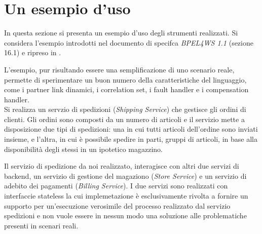 
\section{Un esempio d'uso}

In questa sezione si presenta un esempio d'uso degli strumenti
realizzati. Si considera l'esempio introdotti nel documento di specifca
\emph{BPEL4WS 1.1} \cite{BPEL11Spec} (sezione 16.1) e ripreso in
\cite{LaPuTie1}.

L'esempio, pur risultando essere una semplificazione di uno scenario reale,
permette di sperimentare un buon numero della caratteristiche del linguaggio,	
come i partner link dinamici, i correlation set, i fault handler e i
compensation handler.
\\

Si realizza un servzio di spedizioni (\emph{Shipping Service}) che gestisce
gli ordini di clienti. Gli ordini sono composti da un numero di
articoli e il servizio mette a disposizione due tipi di spedizioni: una in cui
tutti articoli dell'ordine sono inviati insieme, e l'altra, in cui è possibile
spedire in parti, gruppi di articoli, in base alla disponibilità degli stessi in
un ipotetico magazzino.

Il servizio di spedizione da noi realizzato, interagisce con altri due servizi
di backend, un servizio di gestione del magaziono (\emph{Store Service}) e un
servizio di adebito dei pagamenti (\emph{Billing Service}). I due servizi
sono realizzati con interfaccie stateless la cui implemetazione è
esclusivamente rivolta a fornire un supporto per un'esecuzione verosimile del
processo realizzato dal servizio spedizioni e non vuole essere in nessun modo
una soluzione alle problematiche presenti in scenari reali.


